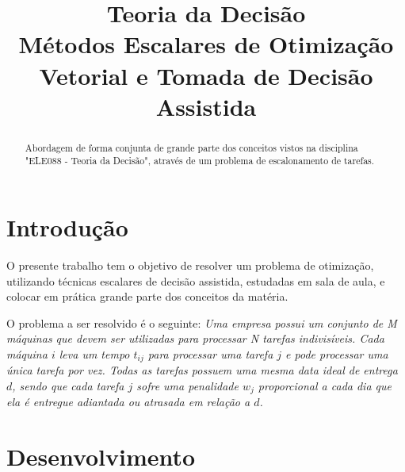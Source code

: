 \documentclass[conference]{IEEEtran}
\begin{document}
\title{Teoria da Decisão\\ Métodos Escalares de Otimização Vetorial e Tomada de Decisão Assistida}


\author{
\and
{}
}

\maketitle

\begin{abstract}
Abordagem de forma conjunta de grande parte dos conceitos vistos na disciplina "ELE088 - Teoria da Decisão", através de um problema de escalonamento de tarefas.
\end{abstract}

\IEEEpeerreviewmaketitle

\section{Introdução}
O presente trabalho tem o objetivo de resolver um problema de otimização, utilizando técnicas escalares de decisão assistida, estudadas em sala de aula, e colocar em prática grande parte dos conceitos da matéria.

O problema a ser resolvido é o seguinte:
\textit{Uma empresa possui um conjunto de M máquinas que devem ser utilizadas para processar N tarefas indivisíveis. Cada máquina $i$ leva um tempo $t_{ij}$ para processar uma tarefa $j$ e pode processar uma única tarefa por vez. Todas as tarefas possuem uma mesma data ideal de entrega $d$, sendo que cada tarefa $j$ sofre uma penalidade $w_j$ proporcional a cada dia que ela é entregue adiantada ou atrasada em relação a $d$.}

\section{Desenvolvimento}
\end{document}
